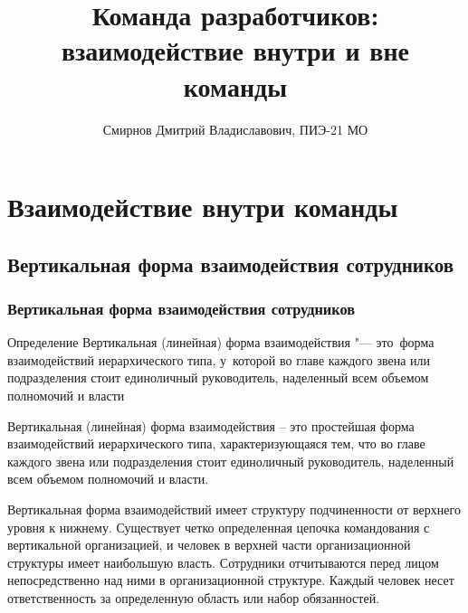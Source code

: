 \documentclass{../industrial-development}
\title{Команда разработчиков: взаимодействие внутри и вне команды}
\author{Смирнов Дмитрий Владиславович, ПИЭ-21 МО}
\date{}
\begin{document}
\begin{frame}
	\titlepage
\end{frame}


\section{Взаимодействие внутри команды}

\subsection{Вертикальная форма взаимодействия сотрудников}

\begin{frame} \frametitle{Вертикальная форма взаимодействия сотрудников}
	\begin{block}{Определение}
		\alert{Вертикальная (линейная) форма взаимодействия} "--- это~форма взаимодействий иерархического типа, у~которой во главе каждого звена или подразделения стоит единоличный руководитель, наделенный всем объемом полномочий и власти
	\end{block}
\end{frame}

\lecturenotes
Вертикальная (линейная) форма взаимодействия –  это простейшая форма взаимодействий иерархического типа, характеризующаяся тем, что во главе каждого звена или подразделения стоит единоличный руководитель, наделенный всем объемом полномочий и власти. 

 Вертикальная форма взаимодействий имеет структуру подчиненности от верхнего уровня к нижнему. Существует четко определенная цепочка командования с вертикальной организацией, и человек в верхней части организационной структуры имеет наибольшую власть. Сотрудники отчитываются перед лицом непосредственно над ними в организационной структуре. Каждый человек несет ответственность за определенную область или набор обязанностей.
\end{document}
